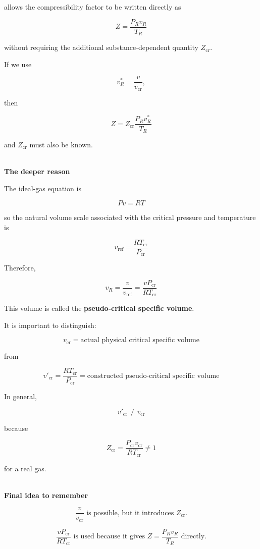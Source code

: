 \documentclass[12pt]{article}
\begin{document}
allows the compressibility factor to be written directly as

\[
\boxed{
Z=\frac{P_Rv_R}{T_R}
}
\]

without requiring the additional substance-dependent quantity $Z_{\mathrm{cr}}$.

If we use

\[
v_R^*=\frac{v}{v_{\mathrm{cr}}},
\]

then

\[
\boxed{
Z=
Z_{\mathrm{cr}}
\frac{P_Rv_R^*}{T_R}
}
\]

and $Z_{\mathrm{cr}}$ must also be known.

\textbf{\\ The deeper reason}

The ideal-gas equation is

\[
Pv=RT
\]

so the natural volume scale associated with the critical pressure and temperature is

\[
\boxed{
v_{\mathrm{ref}}
=
\frac{RT_{\mathrm{cr}}}{P_{\mathrm{cr}}}
}
\]

Therefore,

\[
\boxed{
v_R
=
\frac{v}{v_{\mathrm{ref}}}
=
\frac{vP_{\mathrm{cr}}}{RT_{\mathrm{cr}}}
}
\]

This volume is called the \textbf{pseudo-critical specific volume}.

It is important to distinguish:

\[
\boxed{
v_{\mathrm{cr}}
=
\text{actual physical critical specific volume}
}
\]

from

\[
\boxed{
v'_{\mathrm{cr}}
=
\frac{RT_{\mathrm{cr}}}{P_{\mathrm{cr}}}
=
\text{constructed pseudo-critical specific volume}
}
\]

In general,

\[
\boxed{
v'_{\mathrm{cr}}\neq v_{\mathrm{cr}}
}
\]

because

\[
Z_{\mathrm{cr}}
=
\frac{P_{\mathrm{cr}}v_{\mathrm{cr}}}
{RT_{\mathrm{cr}}}
\neq1
\]

for a real gas.

\textbf{\\ Final idea to remember}

\[
\boxed{
\frac{v}{v_{\mathrm{cr}}}
\text{ is possible, but it introduces }Z_{\mathrm{cr}}.
}
\]

\[
\boxed{
\frac{vP_{\mathrm{cr}}}{RT_{\mathrm{cr}}}
\text{ is used because it gives }
Z=\frac{P_Rv_R}{T_R}
\text{ directly.}
}
\]
\end{document}
